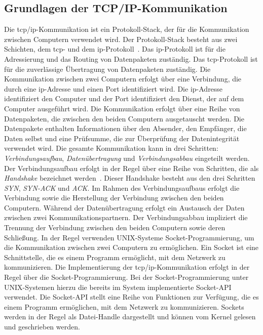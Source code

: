 
\subsection{Grundlagen der TCP/IP-Kommunikation}\label{subsec:tcp/ip-kommunikation}
Die \gls{tcp}/\gls{ip}-Kommunikation ist ein Protokoll-Stack, der für die Kommunikation zwischen Computern verwendet wird.
Der Protokoll-Stack besteht aus zwei Schichten, dem \gls{tcp}- und dem \gls{ip}-Protokoll~\cite{tcp-ip}.
Das \gls{ip}-Protokoll ist für die Adressierung und das Routing von Datenpaketen zuständig.
Das \gls{tcp}-Protokoll ist für die zuverlässige Übertragung von Datenpaketen zuständig.
Die Kommunikation zwischen zwei Computern erfolgt über eine Verbindung, die durch eine \gls{ip}-Adresse und einen Port identifiziert wird.
Die \gls{ip}-Adresse identifiziert den Computer und der Port identifiziert den Dienst, der auf dem Computer ausgeführt wird.
Die Kommunikation erfolgt über eine Reihe von Datenpaketen, die zwischen den beiden Computern ausgetauscht werden.
Die Datenpakete enthalten Informationen über den Absender, den Empfänger, die Daten selbst und eine Prüfsumme,
die zur Überprüfung der Datenintegrität verwendet wird.
Die gesamte Kommunikation kann in drei Schritten: \textit{Verbindungsaufbau}, \textit{Datenübertragung} und \textit{Verbindungsabbau}
eingeteilt werden.
Der Verbindungsaufbau erfolgt in der Regel über eine Reihe von Schritten, die als \textit{Handshake} bezeichnet werden~\cite{tcp-handshake}.
Dieser Handshake besteht aus den drei Schritten \textit{SYN}, \textit{SYN-ACK} und \textit{ACK}.
Im Rahmen des Verbindungsaufbaus erfolgt die Verbindung sowie die Herstellung der Verbindung zwischen den beiden Computern.
Während der Datenübertragung erfolgt ein Austausch der Daten zwischen zwei Kommunikationspartnern.
Der Verbindungsabbau impliziert die Trennung der Verbindung zwischen den beiden Computern sowie deren Schließung.
In der Regel verwenden UNIX-Systeme Socket-Programmierung, um die Kommunikation zwischen zwei Computern zu ermöglichen.
Ein Socket ist eine Schnittstelle, die es einem Programm ermöglicht, mit dem Netzwerk zu kommunizieren.
Die Implementierung der \gls{tcp}/\gls{ip}-Kommunikation erfolgt in der Regel über die Socket-Programmierung.
Bei der Socket-Programmierung unter UNIX-Systemen hierzu die bereits im System implementierte Socket-API verwendet.
Die Socket-API stellt eine Reihe von Funktionen zur Verfügung, die es einem Programm ermöglichen, mit dem Netzwerk zu kommunizieren.
Sockets werden in der Regel als Datei-Handle dargestellt und können vom Kernel gelesen und geschrieben werden.
